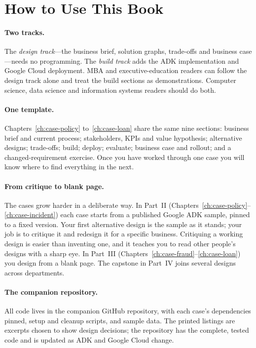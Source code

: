 \section{How to Use This Book}
\label{sec:how-to-use}

\paragraph{Two tracks.} The \emph{design track}---the business brief, solution graphs, trade-offs and business case---needs no programming. The \emph{build track} adds the ADK implementation and Google Cloud deployment. MBA and executive-education readers can follow the design track alone and treat the build sections as demonstrations. Computer science, data science and information systems readers should do both.

\paragraph{One template.} Chapters~\ref{ch:case-policy} to~\ref{ch:case-loan} share the same nine sections: business brief and current process; stakeholders, KPIs and value hypothesis; alternative designs; trade-offs; build; deploy; evaluate; business case and rollout; and a changed-requirement exercise. Once you have worked through one case you will know where to find everything in the next.

\paragraph{From critique to blank page.} The cases grow harder in a deliberate way. In Part~II (Chapters~\ref{ch:case-policy}--\ref{ch:case-incident}) each case starts from a published Google ADK sample, pinned to a fixed version. Your first alternative design is the sample as it stands; your job is to critique it and redesign it for a specific business. Critiquing a working design is easier than inventing one, and it teaches you to read other people's designs with a sharp eye. In Part~III (Chapters~\ref{ch:case-fraud}--\ref{ch:case-loan}) you design from a blank page. The capstone in Part~IV joins several designs across departments.

\paragraph{The companion repository.} All code lives in the companion GitHub repository, with each case's dependencies pinned, setup and cleanup scripts, and sample data. The printed listings are excerpts chosen to show design decisions; the repository has the complete, tested code and is updated as ADK and Google Cloud change.

